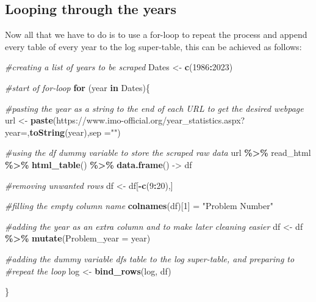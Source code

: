 \documentclass[
]{article}
\newenvironment{Shaded}{\begin{snugshade}}{\end{snugshade}}
\newcommand{\AttributeTok}[1]{\textcolor[rgb]{0.13,0.29,0.53}{#1}}
\newcommand{\CommentTok}[1]{\textcolor[rgb]{0.56,0.35,0.01}{\textit{#1}}}
\newcommand{\ControlFlowTok}[1]{\textcolor[rgb]{0.13,0.29,0.53}{\textbf{#1}}}
\newcommand{\DecValTok}[1]{\textcolor[rgb]{0.00,0.00,0.81}{#1}}
\newcommand{\FunctionTok}[1]{\textcolor[rgb]{0.13,0.29,0.53}{\textbf{#1}}}
\newcommand{\NormalTok}[1]{#1}
\newcommand{\OtherTok}[1]{\textcolor[rgb]{0.56,0.35,0.01}{#1}}
\newcommand{\SpecialCharTok}[1]{\textcolor[rgb]{0.81,0.36,0.00}{\textbf{#1}}}
\newcommand{\StringTok}[1]{\textcolor[rgb]{0.31,0.60,0.02}{#1}}
\begin{document}
\hypertarget{looping-through-the-years}{%
\subsection{Looping through the years}\label{looping-through-the-years}}

Now all that we have to do is to use a for-loop to repeat the process
and append every table of every year to the log super-table, this can be
achieved as follows:

\begin{Shaded}
\begin{Highlighting}[]
\CommentTok{\#creating a list of years to be scraped }
\NormalTok{Dates }\OtherTok{\textless{}{-}} \FunctionTok{c}\NormalTok{(}\DecValTok{1986}\SpecialCharTok{:}\DecValTok{2023}\NormalTok{)}

\CommentTok{\#start of for{-}loop}
\ControlFlowTok{for}\NormalTok{ (year }\ControlFlowTok{in}\NormalTok{ Dates)\{}
  
  \CommentTok{\#pasting the year as a string to the end of each URL to get the desired webpage}
\NormalTok{  url }\OtherTok{\textless{}{-}} \FunctionTok{paste}\NormalTok{(}\StringTok{\textquotesingle{}https://www.imo{-}official.org/year\_statistics.aspx?year=\textquotesingle{}}\NormalTok{,}\FunctionTok{toString}\NormalTok{(year),}\AttributeTok{sep =}\StringTok{""}\NormalTok{)}
  
  \CommentTok{\#using the df dummy variable to store the scraped raw data}
\NormalTok{  url }\SpecialCharTok{\%\textgreater{}\%}\NormalTok{ read\_html }\SpecialCharTok{\%\textgreater{}\%} \FunctionTok{html\_table}\NormalTok{() }\SpecialCharTok{\%\textgreater{}\%} \FunctionTok{data.frame}\NormalTok{() }\OtherTok{{-}\textgreater{}}\NormalTok{ df}
  
  \CommentTok{\#removing unwanted rows}
\NormalTok{  df }\OtherTok{\textless{}{-}}\NormalTok{ df[}\SpecialCharTok{{-}}\FunctionTok{c}\NormalTok{(}\DecValTok{9}\SpecialCharTok{:}\DecValTok{20}\NormalTok{),]}
  
  \CommentTok{\#filling the empty column name}
  \FunctionTok{colnames}\NormalTok{(df)[}\DecValTok{1}\NormalTok{] }\OtherTok{=} \StringTok{"Problem Number"}
  
  \CommentTok{\#adding the year as an extra column and to make later cleaning easier}
\NormalTok{  df }\OtherTok{\textless{}{-}}\NormalTok{ df }\SpecialCharTok{\%\textgreater{}\%} \FunctionTok{mutate}\NormalTok{(}\AttributeTok{Problem\_year =}\NormalTok{ year)}
  
  \CommentTok{\#adding the dummy variable df\textquotesingle{}s table to the log super{-}table, and preparing to}
  \CommentTok{\#repeat the loop}
\NormalTok{  log }\OtherTok{\textless{}{-}} \FunctionTok{bind\_rows}\NormalTok{(log, df)}

\NormalTok{\}}
\end{Highlighting}
\end{Shaded}
\end{document}
